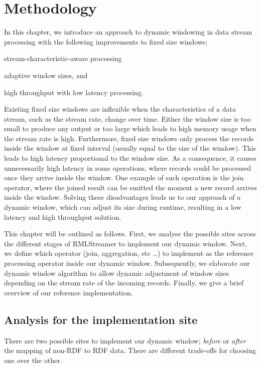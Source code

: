 \chapter{Methodology}%
\label{chap:Methodology}


In this chapter, we introduce an approach to dynamic windowing 
in data stream processing 
with the following improvements to fixed size windows; 
\begin{enumerate*}[label=(\alph*)]
    \item stream-characteristic-aware processing 
    \item adaptive window sizes, and 
    \item high throughput with low latency processing. 
\end{enumerate*}

Existing fixed size windows are inflexible when the characteristics of a data stream,  
such as the stream rate, change over time. Either the window size is 
too small to produce any output or too large which leads to high memory usage when 
the stream rate is high. Furthermore, fixed size windows only process the 
records inside the window at fixed interval (usually equal to the size of the window). 
This leads to high latency proportional to the window size. As a consequence, 
it causes unnecessarily high latency in some operations, where records could be processed once they arrive inside 
the window. One example of such operation is the join operator, where the joined 
result can be emitted the moment a new record arrives inside the window. 
Solving these disadvantages leads us to our approach 
of a dynamic window, which can adjust its size during runtime,
resulting in a low latency and high throughput solution. 


This chapter will be outlined as follows. 
First, we analyse the possible sites across the different stages of 
RMLStreamer to implement our dynamic window. Next, we define which operator
(join, aggregation, etc \dots) to implement as the reference processing operator inside 
our dynamic window. Subsequently, we elaborate our dynamic window algorithm to allow 
dynamic adjustment of window sizes depending on the stream rate of the incoming records.  
Finally, we give a brief overview of our reference implementation.



\section{Analysis for the implementation site}
\label{sec:analysis implementation site}
There are two possible sites to implement our dynamic window; 
\emph{before} or \emph{after} the mapping of non-RDF to RDF data. There are different trade-offs for choosing one 
over the other. 

